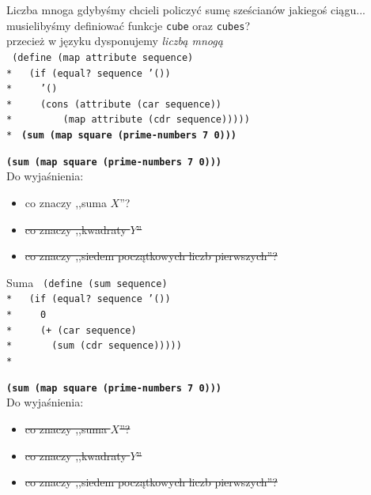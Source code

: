\documentclass{beamer}
\begin{document}
\begin{frame}{Liczba mnoga}
  gdybyśmy chcieli policzyć sumę sześcianów jakiegoś ciągu... \pause
  musielibyśmy definiować funkcje \texttt{cube} oraz \texttt{cubes}? \\ \pause
  przecież w języku dysponujemy \textit{liczbą mnogą} \pause \\
  \texttt{
    (define (map attribute sequence)\\*
    \ \ (if (equal? sequence '())\\*
    \ \ \ \ '()\\*
    \ \ \ \ (cons (attribute (car sequence))\\*
    \ \ \ \ \ \ \ \ (map attribute (cdr sequence)))))\\*\pause
  } 
  \textbf{\texttt{(sum (map square (prime-numbers 7 0)))}}
  
\end{frame}

\begin{frame}
  \textbf{\texttt{(sum (map square (prime-numbers 7 0)))}}\\

  Do wyjaśnienia:
  \begin{itemize}
  \item co znaczy ,,suma $X$''?
  \item \sout{co znaczy ,,kwadraty $Y$''}
  \item \sout{co znaczy ,,siedem początkowych liczb pierwszych''?}
  \end{itemize}
\end{frame}

\begin{frame}{Suma}
  \texttt{
(define (sum sequence) \\*\pause
\ \ (if (equal? sequence '()) \\*\pause
\ \ \ \ 0 \\*\pause
\ \ \ \ (+ (car sequence)\\*
\ \ \ \ \ \ (sum (cdr sequence)))))\\*
  }
\end{frame}

\begin{frame}
  \textbf{\texttt{(sum (map square (prime-numbers 7 0)))}}\\

  Do wyjaśnienia:
  \begin{itemize}
  \item \sout{co znaczy ,,suma $X$''?}
  \item \sout{co znaczy ,,kwadraty $Y$''}
  \item \sout{co znaczy ,,siedem początkowych liczb pierwszych''?}
  \end{itemize}
\end{frame}
\end{document}

